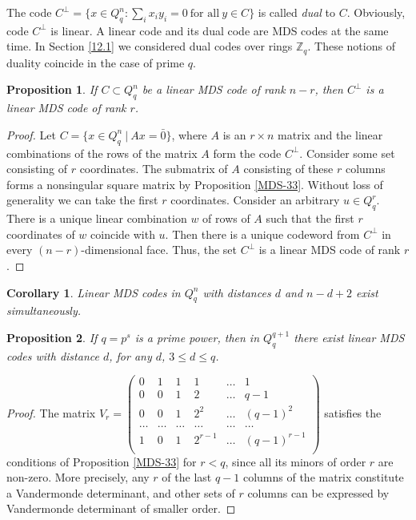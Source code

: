 \documentclass[11pt]{article}
\newtheorem{claim}{Proposition}[section]
\newtheorem{corollary}{Corollary}[section]
\theoremstyle{definition}
\begin{document}
{{{ The code $C^\perp=\{x\in Q_q^n : \sum_i x_iy_i=0\
\mbox{for all}\ y\in C\}$ is called {\sl dual} to $C$. Obviously, code $C^\perp$  is linear. 
A linear code and its dual code are MDS codes at the same time.
In Section \ref{12.1} we considered  dual codes over  rings $\mathbb{Z}_q$. These notions of duality coincide in the case of prime $q$.


\begin{claim} If $C\subset Q_q^n$ be a linear {\rm MDS} code of rank $n-r$,
then $C^\perp$ is a linear {\rm MDS} code of rank $r$.
\end{claim}
\begin{proof} Let $C=\{x\in Q_q^n\ |\ Ax=\bar{0}\}$, where
$A$ is an $r\times n$ matrix and the linear combinations of the rows
of the matrix $A$ form the code $C^\perp$. Consider some set consisting of
$r$ coordinates. The submatrix of $A$ consisting of these $r$ columns forms a nonsingular square matrix by Proposition \ref{MDS-33}.  Without loss of generality we can  take the first $r$ coordinates. Consider an arbitrary  $u\in Q_q^r$.  There is a unique linear combination $w$ of rows of $A$ such that the first $r$ coordinates of $w$ coincide with $u$.   Then  there is a unique codeword from  $C^\perp$ in every $(n-r)$-dimensional face.  
Thus, the set $C^\perp$ is a linear MDS code of rank
$r$.
\end{proof}

\begin{corollary}  Linear {\rm MDS} codes  in $Q_q^n$ with distances $d$
and $n-d+2$ exist simultaneously. \end{corollary}

\begin{claim}\label{RS} If $q=p^s$ is a prime power, then in
$Q_q^{q+1}$ there exist linear {\rm MDS} codes with distance $d$,
for any $d$, $3\leq d\leq q$. \end{claim} \begin{proof} The matrix
$V_r=\left(\begin{array}{cccccc}
0&1&1& 1&\dots&1  \\
0&0&1& 2&\dots& q-1 \\
0&0&1& 2^2 &\dots & (q-1)^2\\
\dots &\dots &\dots & \dots &\dots & \dots \\
1&0&1& 2^{r-1} &\dots & (q-1)^{r-1}\\
\end{array} \right)$
satisfies the conditions of Proposition \ref{MDS-33} for $r< q$,
since all its minors of order $r$ are non-zero. More precisely, any $r$ of
the last $q-1$ columns of the matrix constitute a Vandermonde
determinant, and other sets of $r$ columns can be expressed by Vandermonde determinant of smaller order.
\end{proof}



}}}
\end{document}
